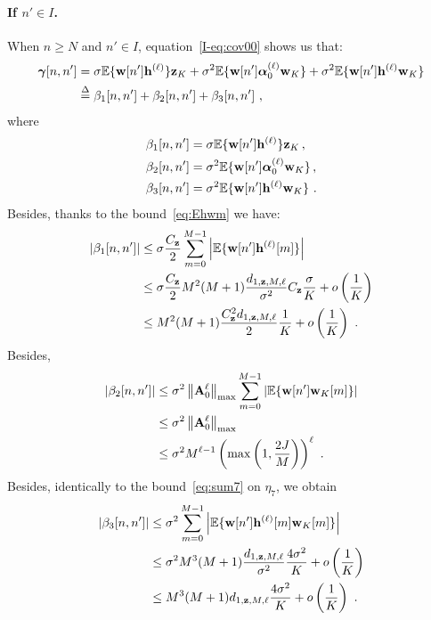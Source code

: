 \documentclass[journal,onecolumn]{IEEEtran}
\begin{document}
\paragraph{If $n'\in I$.}
When $n\geq N$ and $n'\in I$, equation~\eqref{I-eq:cov00} shows us that:
\begin{align*}
\boldsymbol{\gamma}[n,n']&=\sigma{\mathbb E}\{{\mathbf w}[n']{\mathbf h}^{(\ell)}\}{\mathbf z}_K + \sigma^2{\mathbb E}\{{\mathbf w}[n']\boldsymbol{\alpha}_0^{(\ell)}{\mathbf w}_K\} + \sigma^2{\mathbb E}\{{\mathbf w}[n']{\mathbf h}^{(\ell)}{\mathbf w}_K\} \\
& \overset{\Delta}{=} \beta_1[n,n'] + \beta_2[n,n'] + \beta_3[n,n']\ ,
\end{align*}
where
\begin{align*}
\beta_1[n,n'] &= \sigma{\mathbb E}\{{\mathbf w}[n']{\mathbf h}^{(\ell)}\}{\mathbf z}_K\,, \\
\beta_2[n,n'] &= \sigma^2{\mathbb E}\{{\mathbf w}[n']\boldsymbol{\alpha}_0^{(\ell)}{\mathbf w}_K\}\,, \\
\beta_3[n,n'] &= \sigma^2{\mathbb E}\{{\mathbf w}[n']{\mathbf h}^{(\ell)}{\mathbf w}_K\}\ .
\end{align*}
Besides, thanks to the bound~\eqref{eq:Ehwm} we have:
\begin{align}
\nonumber
\left|\beta_1[n,n']\right| &\leq \sigma\dfrac{C_\bz}{2}\sum_{m=0}^{M-1}\left|\EE\{\bw[n']\bh^{(\ell)}[m]\}\right|\\
\nonumber
&\leq \sigma\dfrac{C_\bz}{2}M^2(M+1)\dfrac{d_{1,\bz,M,\ell}}{\sigma^2} C_\bz\dfrac{\sigma}{K} + o\left(\dfrac1K\right)\\
&\leq  M^2(M+1)\dfrac{C_\bz^2 d_{1,\bz,M,\ell}}{2}\dfrac{1}{K} + o\left(\dfrac1K\right)\ .
\label{eq:beta1}
\end{align}
Besides,
\begin{align}
\nonumber
\left|\beta_2[n,n']\right| &\leq \sigma^2\left\|\bA_0^{\ell}\right\|_{\max}\sum_{m=0}^{M-1}\left|\EE\{\bw[n']\bw_K[m]\}\right| \\
\nonumber
&\leq \sigma^2\left\|\bA_0^{\ell}\right\|_{\max} \\
&\leq \sigma^2M^{\ell-1}\left(\max\left(1,\frac{2J}{M}\right)\right)^{\ell}\ .
\label{eq:beta2}
\end{align}
Besides, identically to the bound~\eqref{eq:sum7} on $\eta_7$, we obtain 
\begin{align}
\nonumber
\left|\beta_3[n,n']\right| &\leq \sigma^2\sum_{m=0}^{M-1}\left|\EE\{\bw[n']\bh^{(\ell)}[m]\bw_K[m]\}\right|\\
\nonumber
&\leq \sigma^2 M^3(M+1)\dfrac{d_{1,\bz,M,\ell}}{\sigma^2} \dfrac{4\sigma^2}K + o\left(\dfrac1K\right) \\
&\leq M^3(M+1)d_{1,\bz,M,\ell} \dfrac{4\sigma^2}K + o\left(\dfrac1K\right) \ .
\label{eq:beta3}
\end{align}
\end{document}
